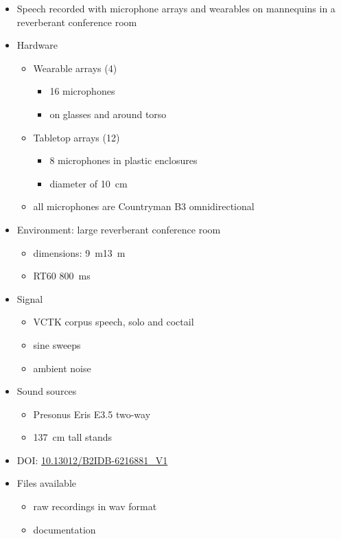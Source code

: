 \documentclass[14pt, oneside]{extarticle}
\begin{document}
\begin{itemize}

\item Speech recorded with microphone arrays and wearables on mannequins in a reverberant conference room \cite{corey2019massive}

\item Hardware
	\begin{itemize}
	\item Wearable arrays (4)
		\begin{itemize}
		\item 16 microphones
		\item on glasses and around torso 
		\end{itemize}
	\item Tabletop arrays (12)
		\begin{itemize}
		\item 8 microphones in plastic enclosures
		\item diameter of \SI{10}{\centi\metre}
		\end{itemize}
	\item all microphones are Countryman B3 omnidirectional
	\end{itemize}

\item Environment: large reverberant conference room
	\begin{itemize}
	\item dimensions: \SI{9}{\metre}\texttimes\SI{13}{\metre}
	\item RT60 \SI{800}{\milli\second} 
	\end{itemize}

\item Signal
	\begin{itemize}
	\item VCTK corpus speech, solo and coctail
	\item sine sweeps
	\item ambient noise
	\end{itemize}

\item Sound sources
	\begin{itemize}
	\item Presonus Eris E3.5 two-way 
	\item \SI{137}{\centi\metre} tall stands
	\end{itemize}

\item DOI: \href{https://databank.illinois.edu/datasets/IDB-6216881}{10.13012/B2IDB-6216881\_V1}

\item Files available
	\begin{itemize}
	\item raw recordings in wav format
	\item documentation
	\end{itemize}

\end{itemize}
\end{document}

